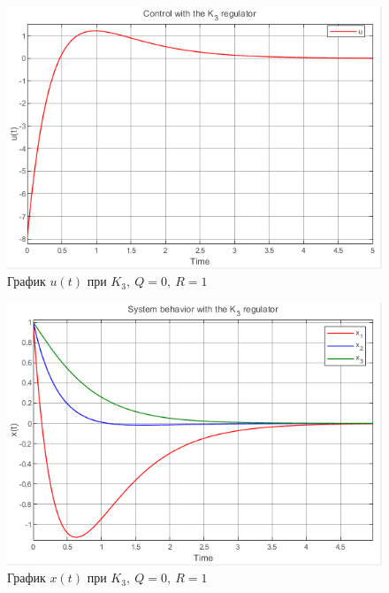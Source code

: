 \documentclass[a4paper, 12pt]{article}
\begin{document}
    \begin{figure}[H]
        \centering
        \includegraphics{3task_K3_u.png}
        \captionsetup{skip=0pt}
        \caption{График $u(t)$ при $K_3,\ Q=0,\ R=1$}
        \label{fig:3task_K3_u}
    \end{figure}
    \begin{figure}[H]
        \centering
        \includegraphics{3task_K3_x.png}
        \captionsetup{skip=0pt}
        \caption{График $x(t)$ при $K_{3},\ Q=0,\ R=1$}
        \label{fig:3task_K3_x}
    \end{figure}
    \newpage
    \vspace*{0.01mm}
\end{document}
